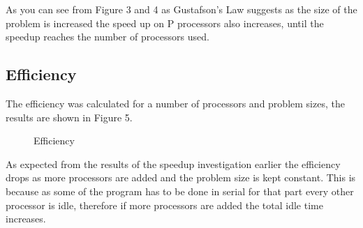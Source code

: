 \documentclass{article}
\begin{document}
  As you can see from Figure 3 and 4 as Gustafson's Law suggests as the size of
  the problem is increased the speed up on P processors also increases, until the
  speedup reaches the number of processors used.

  \subsection{Efficiency}

The efficiency was calculated for a number of processors and problem sizes, the results
are shown in Figure 5.

\begin{figure}[H]
 \centering
 \caption{Efficiency}
 \label{fig:slowdown}
 \end{figure}

As expected from the results of the speedup investigation earlier the efficiency drops
as more processors are added and the problem size is kept constant. This is because
as some of the program has to be done in serial for that part every other processor
is idle, therefore if more processors are added the total idle time increases.
\end{document}
